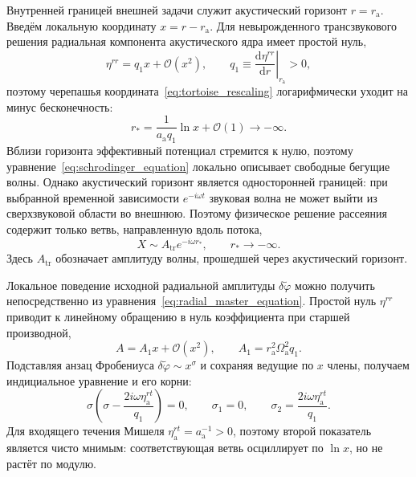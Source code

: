\documentclass[12pt,a4paper,preprint,nopreprintline]{elsarticle}
\begin{document}
Внутренней границей внешней задачи служит акустический горизонт $r=r_{\mathrm{a}}$. Введём локальную координату $x=r-r_{\mathrm{a}}$. Для невырожденного трансзвукового решения радиальная компонента акустического ядра имеет простой нуль,
\begin{equation}
    \eta^{rr}=q_{1}x+\mathcal{O}(x^{2}),
    \qquad
    q_{1}\equiv
    \left.\frac{\mathrm{d}\eta^{rr}}{\mathrm{d}r}\right|_{r_{\mathrm{a}}}
    >0,
    \label{eq:horizon_expansion}
\end{equation}
поэтому черепашья координата~\eqref{eq:tortoise_rescaling} логарифмически уходит на минус бесконечность:
\begin{equation}
    r_{*}
    =
    \frac{1}{a_{\mathrm{a}}q_{1}}\ln x+\mathcal{O}(1)
    \longrightarrow-\infty.
    \label{eq:tortoise_horizon}
\end{equation}
Вблизи горизонта эффективный потенциал стремится к нулю, поэтому уравнение~\eqref{eq:schrodinger_equation} локально описывает свободные бегущие волны. Однако акустический горизонт является односторонней границей: при выбранной временной зависимости $e^{-i\omega t}$ звуковая волна не может выйти из сверхзвуковой области во внешнюю. Поэтому физическое решение рассеяния содержит только ветвь, направленную вдоль потока,
\begin{equation}
    X\sim A_{\mathrm{tr}}e^{-i\omega r_{*}},
    \qquad r_{*}\rightarrow-\infty.
    \label{eq:horizon_boundary_condition}
\end{equation}
Здесь $A_{\mathrm{tr}}$ обозначает амплитуду волны, прошедшей через акустический горизонт.

Локальное поведение исходной радиальной амплитуды $\delta\widetilde{\varphi}$ можно получить непосредственно из уравнения~\eqref{eq:radial_master_equation}. Простой нуль $\eta^{rr}$ приводит к линейному обращению в нуль коэффициента при старшей производной,
\begin{equation}
    A=A_{1}x+\mathcal{O}(x^{2}),
    \qquad
    A_{1}=r_{\mathrm{a}}^{2}\Omega_{\mathrm{a}}^{2}q_{1}.
\end{equation}
Подставляя анзац Фробениуса $\delta\widetilde{\varphi}\sim x^{\sigma}$ и сохраняя ведущие по $x$ члены, получаем индициальное уравнение и его корни:
\begin{equation}
    \sigma
    \left(
        \sigma-\frac{2i\omega\eta^{rt}_{\mathrm{a}}}{q_{1}}
    \right)=0,
    \qquad
    \sigma_{1}=0,
    \qquad
    \sigma_{2}
    =
    \frac{2i\omega\eta^{rt}_{\mathrm{a}}}{q_{1}}.
    \label{eq:horizon_indicial}
\end{equation}
Для входящего течения Мишеля $\eta^{rt}_{\mathrm{a}}=a_{\mathrm{a}}^{-1}>0$, поэтому второй показатель является чисто мнимым: соответствующая ветвь осциллирует по $\ln x$, но не растёт по модулю.
\end{document}
